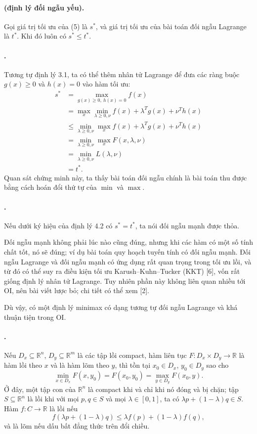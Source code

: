\documentclass[11pt]{article}
\begin{document}
\paragraph{ (định lý đối ngẫu yếu).}
Gọi giá trị tối ưu của (5) là \(s^\ast\), và giá trị tối ưu của bài toán đối
ngẫu Lagrange là \(t^\ast\). Khi đó luôn có \(s^\ast\le t^\ast\).

\paragraph{.}
Tương tự định lý 3.1, ta có thể thêm nhân tử Lagrange để đưa các ràng buộc
\(g(x)\ge 0\) và \(h(x)=0\) vào hàm tối ưu:
\[
\begin{aligned}
  s^\ast
  &= \max_{g(x)\ge 0,\ h(x)=0} f(x)\\
  &= \max_x \min_{\lambda\ge 0,\nu}
     f(x)+\lambda^Tg(x)+\nu^Th(x)\\
  &\le \min_{\lambda\ge 0,\nu}\max_x
     f(x)+\lambda^Tg(x)+\nu^Th(x)\\
  &= \min_{\lambda\ge 0,\nu}\max_x F(x,\lambda,\nu)\\
  &= \min_{\lambda\ge 0,\nu}L(\lambda,\nu)\\
  &= t^\ast.
\end{aligned}
\]
Quan sát chứng minh này, ta thấy bài toán đối ngẫu chính là bài toán thu được
bằng cách hoán đổi thứ tự của \(\min\) và \(\max\).

\paragraph{.}
Nếu dưới ký hiệu của định lý 4.2 có \(s^\ast=t^\ast\), ta nói đối ngẫu mạnh
được thỏa.

Đối ngẫu mạnh không phải lúc nào cũng đúng, nhưng khi các hàm có một số tính
chất tốt, nó sẽ đúng; ví dụ bài toán quy hoạch tuyến tính có đối ngẫu mạnh.
Đối ngẫu Lagrange và đối ngẫu mạnh có ứng dụng rất quan trọng trong tối ưu lồi,
và từ đó có thể suy ra điều kiện tối ưu Karush--Kuhn--Tucker (KKT) [6], vốn rất
giống định lý nhân tử Lagrange. Tuy nhiên phần này không liên quan nhiều tới OI,
nên bài viết lược bỏ; chi tiết có thể xem [2].

Dù vậy, có một định lý minimax có dạng tương tự đối ngẫu Lagrange và khá thuận
tiện trong OI.

\paragraph{.}
Nếu \(D_x\subseteq\mathbb R^n\), \(D_y\subseteq\mathbb R^m\) là các tập lồi
compact, hàm liên tục \(F:D_x\times D_y\to\mathbb R\) là hàm lồi theo \(x\) và
là hàm lõm theo \(y\), thì tồn tại \(x_0\in D_x\), \(y_0\in D_y\) sao cho
\[
  \min_{x\in D_x}F(x,y_0)=F(x_0,y_0)=\max_{y\in D_y}F(x_0,y).
\]
Ở đây, một tập con của \(\mathbb R^n\) là compact khi và chỉ khi nó đóng và bị
chặn; tập \(S\subseteq\mathbb R^n\) là lồi khi với mọi \(p,q\in S\) và mọi
\(\lambda\in[0,1]\), ta có \(\lambda p+(1-\lambda)q\in S\). Hàm
\(f:C\to\mathbb R\) là lồi nếu
\[
  f(\lambda p+(1-\lambda)q)\le \lambda f(p)+(1-\lambda)f(q),
\]
và là lõm nếu dấu bất đẳng thức trên đổi chiều.
\end{document}
